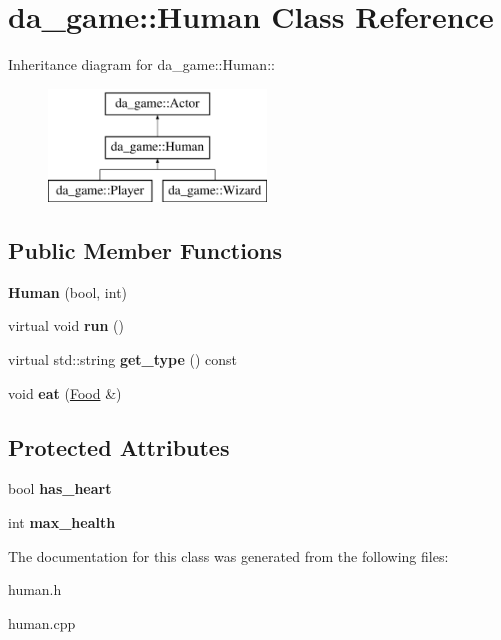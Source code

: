 \hypertarget{classda__game_1_1Human}{
\section{da\_\-game::Human Class Reference}
\label{classda__game_1_1Human}
}
Inheritance diagram for da\_\-game::Human::\begin{figure}[H]
\begin{center}
\leavevmode
\includegraphics[height=3cm]{classda__game_1_1Human}
\end{center}
\end{figure}
\subsection*{Public Member Functions}
\begin{DoxyCompactItemize}
\item 
\hypertarget{classda__game_1_1Human_aed0a521eea5a8fa1cce0bc0accd616ae}{
{\bfseries Human} (bool, int)}
\label{classda__game_1_1Human_aed0a521eea5a8fa1cce0bc0accd616ae}

\item 
\hypertarget{classda__game_1_1Human_a7861ade5e3d97c1945690f961f6aa2f0}{
virtual void {\bfseries run} ()}
\label{classda__game_1_1Human_a7861ade5e3d97c1945690f961f6aa2f0}

\item 
\hypertarget{classda__game_1_1Human_ae8cf665bea081f6eb7cb9889e77ceafb}{
virtual std::string {\bfseries get\_\-type} () const }
\label{classda__game_1_1Human_ae8cf665bea081f6eb7cb9889e77ceafb}

\item 
\hypertarget{classda__game_1_1Human_a2700b5d52961ba140d14d4da246b1a77}{
void {\bfseries eat} (\hyperlink{classda__game_1_1Food}{Food} \&)}
\label{classda__game_1_1Human_a2700b5d52961ba140d14d4da246b1a77}

\end{DoxyCompactItemize}
\subsection*{Protected Attributes}
\begin{DoxyCompactItemize}
\item 
\hypertarget{classda__game_1_1Human_a1b81e3167c625be17bb25e1edf273a77}{
bool {\bfseries has\_\-heart}}
\label{classda__game_1_1Human_a1b81e3167c625be17bb25e1edf273a77}

\item 
\hypertarget{classda__game_1_1Human_a4e47ed43e00e5604e671e432c008d764}{
int {\bfseries max\_\-health}}
\label{classda__game_1_1Human_a4e47ed43e00e5604e671e432c008d764}

\end{DoxyCompactItemize}


The documentation for this class was generated from the following files:\begin{DoxyCompactItemize}
\item 
human.h\item 
human.cpp\end{DoxyCompactItemize}
